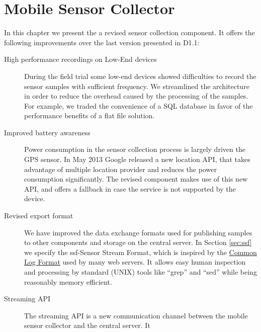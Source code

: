 \label{chap:SensorCollection}

\section{Mobile Sensor Collector}
\label{sec:SensorColllection}

In this chapter we present the a revised sensor collection
component. It offers the following improvements over the last version
presented in D1.1:
\begin{description}
\item[High performance recordings on Low-End devices] During the field
  trial some low-end devices showed difficulties to record the sensor
  samples with sufficient frequency. We streamlined the architecture
  in order to reduce the overhead caused by the processing of the
  samples. For example, we traded the convenience of a SQL database in
  favor of the performance benefits of a flat file solution.
\item[Improved battery awareness] Power consumption in the sensor
  collection process is largely driven the GPS sensor. In May 2013
  Google released a new location API, that takes advantage of multiple
  location provider and reduces the power consumption significantly.
  The revised component makes use of this new API, and offers a
  fallback in case the service is not supported by the device.
\item[Revised export format] We have improved the data exchange
  formats used for publishing samples to other components and storage
  on the central server. In Section \ref{sec:ssf} we specify the
  ssf-Sensor Stream Format, which is inspired by the
  \href{http://en.wikipedia.org/wiki/Common\_Log\_Format}{Common Log
    Format} used by many web servers. It allows easy human inspection
  and processing by standard (UNIX) tools like ``grep'' and ``sed''
  while being reasonably memory efficient.
\item[Streaming API] The streaming API is a new communication channel
  between the mobile sensor collector and the central server. It

\end{description}
